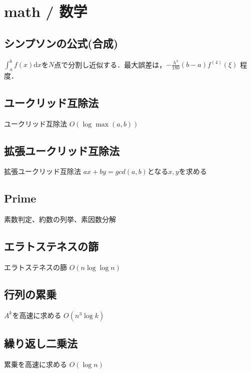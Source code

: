 \section{math / 数学}

\subsection{シンプソンの公式(合成)}
$\int_a^b f(x) \mathrm{d}x$を$N$点で分割し近似する．最大誤差は，$-\frac{h^4}{180}(b-a)f^{(4)}(\xi)$ 程度．


\subsection{ユークリッド互除法}
ユークリッド互除法
$O(\log \max(a,b))$


\subsection{拡張ユークリッド互除法}
拡張ユークリッド互除法
$ax + by = gcd(a,b)$となる$x,y$を求める


\subsection{Prime}
素数判定、約数の列挙、素因数分解


\subsection{エラトステネスの篩}
エラトステネスの篩
$O(n \log\log n)$


\subsection{行列の累乗}
$A^k$を高速に求める
$O(n^3 \log k)$


\subsection{繰り返し二乗法}
累乗を高速に求める
$O(\log n)$


